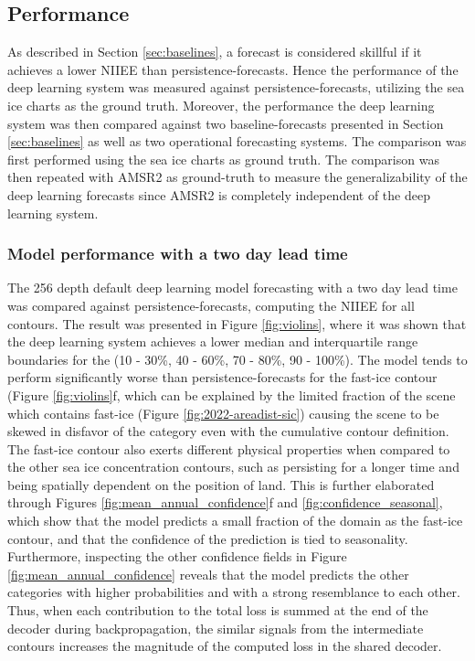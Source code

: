 \documentclass[../main/thesis]{subfiles}
\begin{document}
\subsection{Performance}
As described in Section \ref{sec:baselines}, a forecast is considered skillful if it achieves a lower NIIEE than persistence-forecasts. Hence the performance of the deep learning system was measured against persistence-forecasts, utilizing the sea ice charts as the ground truth. Moreover, the performance the deep learning system was then compared against two baseline-forecasts presented in Section \ref{sec:baselines} as well as two operational forecasting systems. The comparison was first performed using the sea ice charts as ground truth. The comparison was then repeated with AMSR2 as ground-truth to measure the generalizability of the deep learning forecasts since AMSR2 is completely independent of the deep learning system.

\subsubsection{Model performance with a two day lead time}
\label{sec:performance_confidence}
The 256 depth default deep learning model forecasting with a two day lead time was compared against persistence-forecasts, computing the NIIEE for all contours. The result was presented in Figure \ref{fig:violins}, where it was shown that the deep learning system achieves a lower median and interquartile range boundaries for the (10 - 30\%, 40 - 60\%, 70 - 80\%, 90 - 100\%). The model tends to perform significantly worse than persistence-forecasts for the fast-ice contour (Figure \ref{fig:violins}f, which can be explained by the limited fraction of the scene which contains fast-ice (Figure \ref{fig:2022-areadist-sic}) causing the scene to be skewed in disfavor of the category even with the cumulative contour definition. The fast-ice contour also exerts different physical properties when compared to the other sea ice concentration contours, such as persisting for a longer time and being spatially dependent on the position of land. This is further elaborated through Figures \ref{fig:mean_annual_confidence}f and \ref{fig:confidence_seasonal}, which show that the model predicts a small fraction of the domain as the fast-ice contour, and that the confidence of the prediction is tied to seasonality. Furthermore, inspecting the other confidence fields in Figure \ref{fig:mean_annual_confidence} reveals that the model predicts the other categories with higher probabilities and with a strong resemblance to each other. Thus, when each contribution to the total loss is summed at the end of the decoder during backpropagation, the similar signals from the intermediate contours increases the magnitude of the computed loss in the shared decoder.
\end{document}
